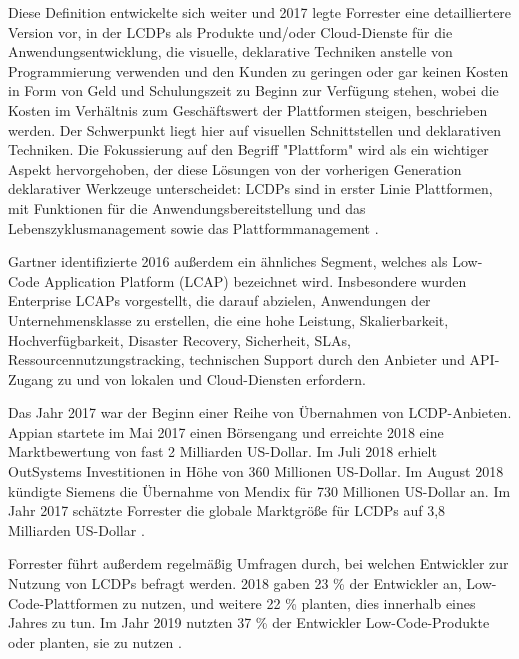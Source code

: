 \documentclass[12pt]{article} %
\begin{document}
	Diese Definition entwickelte sich weiter und 2017 legte Forrester eine detailliertere Version vor, in der LCDPs als Produkte und/oder Cloud-Dienste für die Anwendungsentwicklung, die visuelle, deklarative Techniken anstelle von Programmierung verwenden und den Kunden zu geringen oder gar keinen Kosten in Form von Geld und Schulungszeit zu Beginn zur Verfügung stehen, wobei die Kosten im Verhältnis zum Geschäftswert der Plattformen steigen, beschrieben werden. 
	Der Schwerpunkt liegt hier auf visuellen Schnittstellen und deklarativen Techniken. Die Fokussierung auf den Begriff "Plattform" wird als ein wichtiger Aspekt hervorgehoben, der diese Lösungen von der vorherigen Generation deklarativer Werkzeuge unterscheidet: LCDPs sind in erster Linie Plattformen, mit Funktionen für die Anwendungsbereitstellung und das Lebenszyklusmanagement sowie das Plattformmanagement \cite{DiRuscio.2022}. \newline
	
	Gartner identifizierte 2016 außerdem ein ähnliches Segment, welches als Low-Code Application Platform (LCAP) bezeichnet wird. Insbesondere wurden Enterprise LCAPs vorgestellt, die darauf abzielen, Anwendungen der Unternehmensklasse zu erstellen, die eine hohe Leistung, Skalierbarkeit, Hochverfügbarkeit, Disaster Recovery, Sicherheit, SLAs, Ressourcennutzungstracking, technischen Support durch den Anbieter und API-Zugang zu und von lokalen und Cloud-Diensten erfordern\cite{DiRuscio.2022}. \newline %
	
	Das Jahr 2017 war der Beginn einer Reihe von Übernahmen von LCDP-Anbieten. Appian startete im Mai 2017 einen Börsengang und erreichte 2018 eine Marktbewertung von fast 2 Milliarden US-Dollar. Im Juli 2018 erhielt OutSystems Investitionen in Höhe von 360 Millionen US-Dollar. Im August 2018 kündigte Siemens die Übernahme von Mendix für 730 Millionen US-Dollar an. Im Jahr 2017 schätzte Forrester die globale Marktgröße für LCDPs auf 3,8 Milliarden US-Dollar \cite{DiRuscio.2022}. \newline 
		
	Forrester führt außerdem regelmäßig Umfragen durch, bei welchen Entwickler zur Nutzung von LCDPs befragt werden. 2018 gaben 23 \% der Entwickler an, Low-Code-Plattformen zu nutzen, und weitere 22 \% planten, dies innerhalb eines Jahres zu tun. Im Jahr 2019 nutzten 37 \% der Entwickler Low-Code-Produkte oder planten, sie zu nutzen \cite{DiRuscio.2022}.\newline
	
\end{document}
